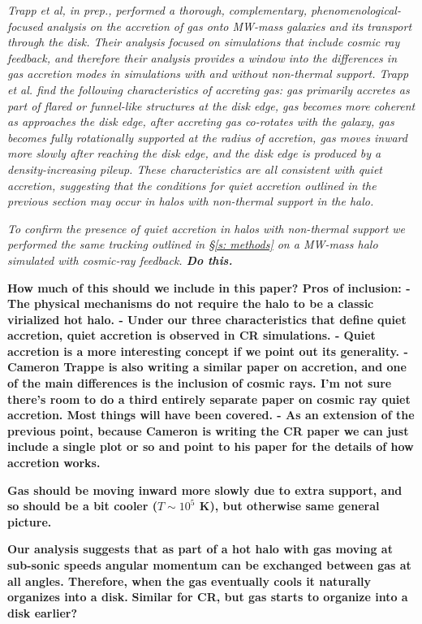\documentclass[fleqn,usenatbib]{mnras}
\begin{document}
\textit{
Trapp et al, in prep., performed a thorough, complementary, phenomenological-focused analysis on the accretion of gas onto MW-mass galaxies and its transport through the disk.
Their analysis focused on simulations that include cosmic ray feedback, and therefore their analysis provides a window into the differences in gas accretion modes in simulations with and without non-thermal support.
Trapp et al. find the following characteristics of accreting gas:
gas primarily accretes as part of flared or funnel-like structures at the disk edge,
gas becomes more coherent as approaches the disk edge,
after accreting gas co-rotates with the galaxy,
gas becomes fully rotationally supported at the radius of accretion,
gas moves inward more slowly after reaching the disk edge,
and the disk edge is produced by a density-increasing pileup.
These characteristics are all consistent with quiet accretion, suggesting that the conditions for quiet accretion outlined in the previous section may occur in halos with non-thermal support in the halo.
}

\textit{
To confirm the presence of quiet accretion in halos with non-thermal support we performed the same tracking outlined in \S\ref{s: methods} on a MW-mass halo simulated with cosmic-ray feedback.
\textbf{Do this.}
}

\textbf{How much of this should we include in this paper?
Pros of inclusion:
- The physical mechanisms do not require the halo to be a classic virialized hot halo.
- Under our three characteristics that define quiet accretion, quiet accretion is observed in CR simulations.
- Quiet accretion is a more interesting concept if we point out its generality.
- Cameron Trappe is also writing a similar paper on accretion, and one of the main differences is the inclusion of cosmic rays. I'm not sure there's room to do a third entirely separate paper on cosmic ray quiet accretion. Most things will have been covered.
- As an extension of the previous point, because Cameron is writing the CR paper we can just include a single plot or so and point to his paper for the details of how accretion works.
}

\textbf{Gas should be moving inward more slowly due to extra support, and so should be a bit cooler ($T\sim 10^5$ K), but otherwise same general picture.}

\textbf{
Our analysis suggests that as part of a hot halo with gas moving at sub-sonic speeds angular momentum can be exchanged between gas at all angles.
Therefore, when the gas eventually cools it naturally organizes into a disk.
}
\textbf{
Similar for CR, but gas starts to organize into a disk earlier?
}
\end{document}
